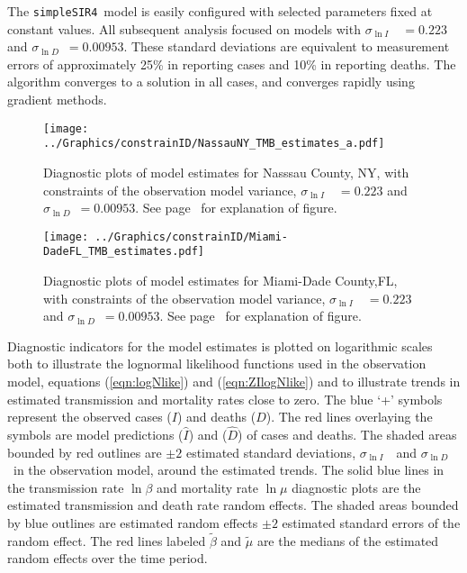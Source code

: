 \documentclass[12pt,letterpaper]{article}
\newcommand\SSm{{\tt simpleSIR4}}
\newcommand\slI{$\sigma_{\ln I}$\ }
\newcommand\slD{$\sigma_{\ln D}$}
\newcommand\slB{$\sigma_{\ln \beta}$}
\newcommand\slM{$\sigma_{\ln \mu}$}
\begin{document}
The \SSm\ model is easily configured with selected parameters fixed at
constant values. 
All subsequent analysis focused on models with 
\slI~$ = 0.223$ and \slD~$= 0.00953$. 
These standard deviations are equivalent to measurement errors of
approximately 25\% in reporting cases and 10\% in reporting deaths.
The algorithm converges to a solution in all cases, and converges
rapidly using gradient methods.

\begin{figure}
\begin{center}
\texttt{[image: ../Graphics/constrainID/NassauNY\_TMB\_estimates\_a.pdf]}
\end{center}
\caption{\label{fig:estsNaNYc}
Diagnostic plots of model estimates for Nasssau County, NY, 
with constraints of the observation model variance, 
\slI~$ = 0.223$ and \slD~$= 0.00953$. 
See page~\pageref{pp:diagexpl} for explanation of figure.
}
\end{figure}

\begin{figure}
\begin{center}
\texttt{[image: ../Graphics/constrainID/Miami-DadeFL\_TMB\_estimates.pdf]}
\end{center}
\caption{\label{fig:estsMDFLc}
Diagnostic plots of model estimates for Miami-Dade County,FL,
with constraints of the observation model variance, 
\slI~$ = 0.223$ and \slD~$= 0.00953$. 
See page~\pageref{pp:diagexpl} for explanation of figure.
}
\end{figure}

\label{pp:diagexpl} 
Diagnostic indicators for the model estimates is plotted
on logarithmic scales both to illustrate the
lognormal likelihood functions used in the observation model,
equations (\ref{eqn:logNlike}) and (\ref{eqn:ZIlogNlike}) and to
illustrate trends in estimated transmission and mortality rates close
to zero.
The blue `+' symbols represent the observed cases ($I$) and deaths ($D$).
The red lines overlaying the symbols are model predictions ($\widehat{I}$)
and ($\widehat{D}$) of cases and deaths. 
The shaded areas bounded by red outlines are 
$\pm 2$ estimated standard deviations, \slI\ and \slD\ in the
observation model, around the estimated trends.
The solid blue lines in the transmission rate $\ln \beta$ and
mortality rate $\ln \mu$ diagnostic plots are the estimated
transmission and death rate random effects.
The shaded areas bounded by blue outlines are
estimated random effects $\pm 2$ estimated standard errors of the
random effect.
The red lines labeled $\tilde{\beta}$ and $\tilde{\mu}$ are the
medians of the estimated random effects over the time period.
\end{document}
